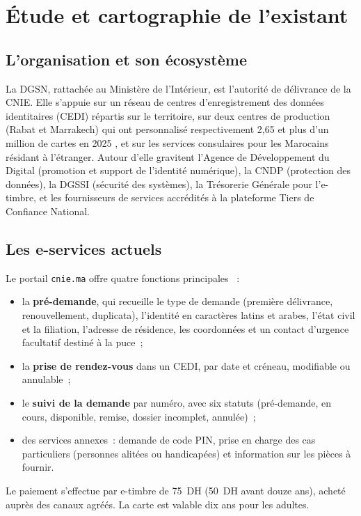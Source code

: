 \section{Étude et cartographie de l'existant}
\label{sec:existant}

\subsection{L'organisation et son écosystème}
La DGSN, rattachée au Ministère de l'Intérieur, est l'autorité de délivrance de la CNIE. Elle s'appuie sur un réseau de centres d'enregistrement des données identitaires (CEDI) répartis sur le territoire, sur deux centres de production (Rabat et Marrakech) qui ont personnalisé respectivement 2,65 et plus d'un million de cartes en 2025 \cite{lavieeco2025bilan}, et sur les services consulaires pour les Marocains résidant à l'étranger. Autour d'elle gravitent l'Agence de Développement du Digital (promotion et support de l'identité numérique), la CNDP (protection des données), la DGSSI (sécurité des systèmes), la Trésorerie Générale pour l'e-timbre, et les fournisseurs de services accrédités à la plateforme Tiers de Confiance National.

\subsection{Les e-services actuels}
Le portail \texttt{cnie.ma} offre quatre fonctions principales \cite{infopratique2026, wadifa2026}~:
\begin{itemize}
  \item la \textbf{pré-demande}, qui recueille le type de demande (première délivrance, renouvellement, duplicata), l'identité en caractères latins et arabes, l'état civil et la filiation, l'adresse de résidence, les coordonnées et un contact d'urgence facultatif destiné à la puce~;
  \item la \textbf{prise de rendez-vous} dans un CEDI, par date et créneau, modifiable ou annulable~;
  \item le \textbf{suivi de la demande} par numéro, avec six statuts (pré-demande, en cours, disponible, remise, dossier incomplet, annulée)~;
  \item des services annexes~: demande de code PIN, prise en charge des cas particuliers (personnes alitées ou handicapées) et information sur les pièces à fournir.
\end{itemize}
Le paiement s'effectue par e-timbre de 75~DH (50~DH avant douze ans), acheté auprès des canaux agréés. La carte est valable dix ans pour les adultes.

